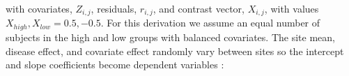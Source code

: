 with covariates, $Z_{i,j}$, residuals, $r_{i,j}$, and contrast vector, $X_{i,j}$, with values $X_{high}, X_{low} = 0.5,-0.5$. For this derivation we assume an equal number of subjects in the high and low groups with balanced covariates. The site mean, disease effect, and covariate effect randomly vary between sites so the intercept and slope coefficients become dependent variables \cite{Raudenbush2000}: